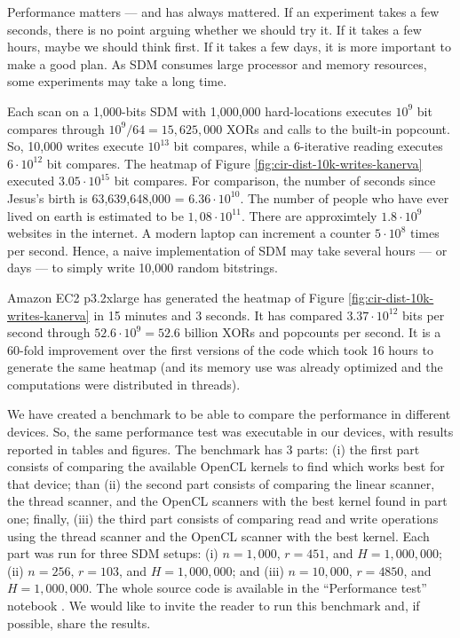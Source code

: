 
Performance matters --- and has always mattered. If an experiment takes a few seconds, there is no point arguing whether we should try it. If it takes a few hours, maybe we should think first. If it takes a few days, it is more important to make a good plan. As SDM consumes large processor and memory resources, some experiments may take a long time.

Each scan on a 1,000-bits SDM with 1,000,000 hard-locations executes $10^9$ bit compares through $10^9/64 = 15,625,000$ XORs and calls to the built-in popcount. So, 10,000 writes execute $10^{13}$ bit compares, while a 6-iterative reading executes $6 \cdot 10^{12}$ bit compares. The heatmap of Figure \ref{fig:cir-dist-10k-writes-kanerva} executed $3.05 \cdot 10^{15}$ bit compares. For comparison, the number of seconds since Jesus's birth is 63,639,648,000 = $6.36 \cdot 10^{10}$. The number of people who have ever lived on earth is estimated to be $1,08 \cdot 10^{11}$. There are approximtely $1.8 \cdot 10^{9}$ websites in the internet. A modern laptop can increment a counter $5 \cdot 10^{8}$ times per second. Hence, a naive implementation of SDM may take several hours --- or days --- to simply write 10,000 random bitstrings.

Amazon EC2 p3.2xlarge has generated the heatmap of Figure \ref{fig:cir-dist-10k-writes-kanerva} in 15 minutes and 3 seconds. It has compared $3.37 \cdot 10^{12}$ bits per second through $52.6 \cdot 10^{9} = 52.6 \text{ billion}$ XORs and popcounts per second. It is a 60-fold improvement over the first versions of the code which took 16 hours to generate the same heatmap (and its memory use was already optimized and the computations were distributed in threads).

We have created a benchmark to be able to compare the performance in different devices. So, the same performance test was executable in our devices, with results reported in tables and figures. The benchmark has 3 parts: (i) the first part consists of comparing the available OpenCL kernels to find which works best for that device; than (ii) the second part consists of comparing the linear scanner, the thread scanner, and the OpenCL scanners with the best kernel found in part one; finally, (iii) the third part consists of comparing read and write operations using the thread scanner and the OpenCL scanner with the best kernel. Each part was run for three SDM setups: (i) $n=1,000$, $r=451$, and $H=1,000,000$; (ii) $n=256$, $r=103$, and $H=1,000,000$; and (iii) $n=10,000$, $r=4850$, and $H=1,000,000$. The whole source code is available in the ``Performance test'' notebook \citep{sdmframework}. We would like to invite the reader to run this benchmark and, if possible, share the results.

